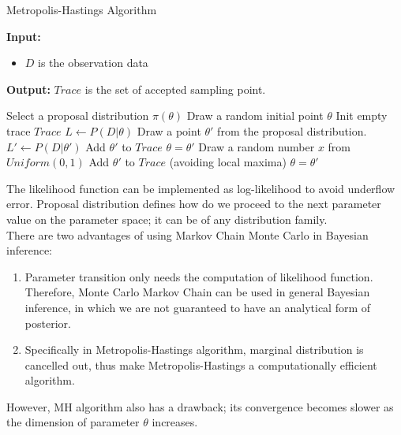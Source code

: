 \begin{algorithm}[H]
    \caption{Metropolis-Hastings Algorithm}\label{mhalg}
    \hspace*{\algorithmicindent} \textbf{Input:}
    \begin{itemize}
        \item $D$ is the observation data
    \end{itemize}
    \hspace*{\algorithmicindent} \textbf{Output:} $Trace$ is the set of accepted
    sampling point.
    \begin{algorithmic}[1]
        \State Select a proposal distribution $\pi(\theta)$
        \State Draw a random initial point $\theta$
        \State Init empty trace $Trace$
        \State $L \leftarrow P(D|\theta)$
        \State Draw a point $\theta' $ from the proposal distribution.
        \State $L' \leftarrow P(D|\theta')$
        \State Add $\theta'$ to $Trace$
        \State $\theta = \theta'$
        \Else
        \State Draw a random number $x$ from $Uniform(0,1)$
        \State Add $\theta'$ to $Trace$ (avoiding local maxima)
        \State $\theta = \theta'$
        \EndIf
        \EndIf
        \EndWhile
        \EndProcedure
    \end{algorithmic}
\end{algorithm}
The likelihood function can be implemented as log-likelihood to avoid underflow
error. Proposal distribution defines how do we proceed to the next parameter
value on the parameter space; it can be of any distribution family.\\
There are two advantages of using Markov Chain Monte Carlo in Bayesian inference:
\begin{enumerate}
    \item Parameter transition only needs the computation of likelihood function.
          Therefore, Monte Carlo Markov Chain can be used in general Bayesian inference,
          in which we are not guaranteed to have an analytical form of posterior.
    \item Specifically in Metropolis-Hastings algorithm, marginal distribution is
          cancelled out, thus make Metropolis-Hastings a computationally efficient algorithm.
\end{enumerate}
However, MH algorithm also has a drawback; its convergence becomes slower as the
dimension of parameter $\theta$ increases.

